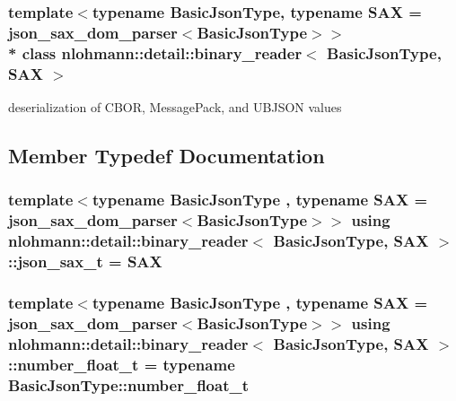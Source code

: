 \subsubsection*{template$<$typename Basic\+Json\+Type, typename S\+AX = json\+\_\+sax\+\_\+dom\+\_\+parser$<$\+Basic\+Json\+Type$>$$>$\\*
class nlohmann\+::detail\+::binary\+\_\+reader$<$ Basic\+Json\+Type, S\+A\+X $>$}

deserialization of C\+B\+OR, Message\+Pack, and U\+B\+J\+S\+ON values 

\subsection{Member Typedef Documentation}
\subsubsection[{\texorpdfstring{json\+\_\+sax\+\_\+t}{json_sax_t}}]{\setlength{\rightskip}{0pt plus 5cm}template$<$typename Basic\+Json\+Type , typename S\+AX  = json\+\_\+sax\+\_\+dom\+\_\+parser$<$\+Basic\+Json\+Type$>$$>$ using {\bf nlohmann\+::detail\+::binary\+\_\+reader}$<$ Basic\+Json\+Type, S\+AX $>$\+::{\bf json\+\_\+sax\+\_\+t} =  S\+AX\hspace{0.3cm}{\ttfamily [private]}}\hypertarget{classnlohmann_1_1detail_1_1binary__reader_a43c5dc6a3219f64a7824d7ba9c7b14ae}{}\label{classnlohmann_1_1detail_1_1binary__reader_a43c5dc6a3219f64a7824d7ba9c7b14ae}
\subsubsection[{\texorpdfstring{number\+\_\+float\+\_\+t}{number_float_t}}]{\setlength{\rightskip}{0pt plus 5cm}template$<$typename Basic\+Json\+Type , typename S\+AX  = json\+\_\+sax\+\_\+dom\+\_\+parser$<$\+Basic\+Json\+Type$>$$>$ using {\bf nlohmann\+::detail\+::binary\+\_\+reader}$<$ Basic\+Json\+Type, S\+AX $>$\+::{\bf number\+\_\+float\+\_\+t} =  typename Basic\+Json\+Type\+::number\+\_\+float\+\_\+t\hspace{0.3cm}{\ttfamily [private]}}\hypertarget{classnlohmann_1_1detail_1_1binary__reader_af4488e5400da86636fd2f4d0171bbf53}{}\label{classnlohmann_1_1detail_1_1binary__reader_af4488e5400da86636fd2f4d0171bbf53}
